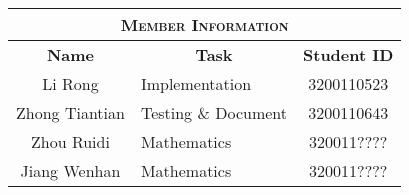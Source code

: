 \begin{table}[htp]
    \centering
    \begin{tabular}{@{}clc@{}}
        \toprule
        \multicolumn{3}{c}{\textsc{\textbf{Member Information}}}                                                               \\ \midrule\midrule
        \multicolumn{1}{c|}{\textbf{Name}}  & \multicolumn{1}{c|}{\textbf{Task}}       & \textbf{Student ID} \\ \midrule
        \multicolumn{1}{c|}{Li Rong}        & \multicolumn{1}{l|}{Implementation}      & 3200110523          \\
        \multicolumn{1}{c|}{Zhong Tiantian} & \multicolumn{1}{l|}{Testing \& Document} & 3200110643          \\
        \multicolumn{1}{c|}{Zhou Ruidi}     & \multicolumn{1}{l|}{Mathematics}         & 320011????          \\
        \multicolumn{1}{c|}{Jiang Wenhan}   & \multicolumn{1}{l|}{Mathematics}         & 320011????          \\ \bottomrule
    \end{tabular}
\end{table}